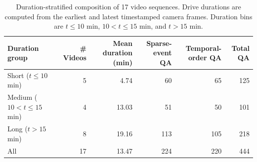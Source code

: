 \begin{table}[t]
\centering
\begin{tabular}{lrrrrr}
\toprule
\textbf{Duration group} & \textbf{\# Videos} & \textbf{Mean duration (min)} & \textbf{Sparse-event QA} & \textbf{Temporal-order QA} & \textbf{Total QA} \\
\midrule
Short ($t \leq 10$ min) & 5 & 4.74 & 60 & 65 & 125 \\
Medium ($10 < t \leq 15$ min) & 4 & 13.03 & 51 & 50 & 101 \\
Long ($t > 15$ min) & 8 & 19.16 & 113 & 105 & 218 \\
\midrule
All & 17 & 13.47 & 224 & 220 & 444 \\
\bottomrule
\end{tabular}
\caption{Duration-stratified composition of 17 video sequences. Drive durations are computed from the earliest and latest timestamped camera frames. Duration bins are $t \leq 10$ min, $10 < t \leq 15$ min, and $t > 15$ min.}
\label{tab:duration_composition}
\end{table}
